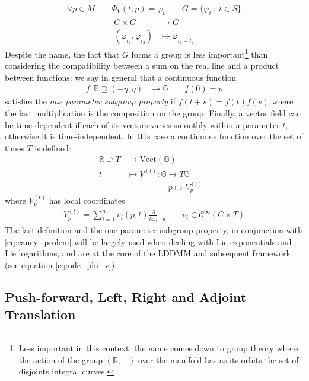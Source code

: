 \begin{align*}
\forall p \in M \qquad \Phi_{V}(t,p) = \varphi_{t}  \qquad G = \{ \varphi_{t} ~:~ t \in S\}
\end{align*}
\begin{align*}
G\times G &\longrightarrow G   \\
(\varphi_{t_1} ,\varphi_{t_2} ) &\longmapsto  \varphi_{t_1 + t_2} 
\end{align*}
Despite the name, the fact that $G$ forms a group is less important\footnote{Less important in this context: the name comes down to group theory where the action of the group $(\mathbb{R},+)$ over the manifold has as its orbits the set of disjoints integral curves.} than considering the compatibility between a sum on the real line and a product between functions: we say in general that a continuous function
\begin{align*}
f : \mathbb{R}\supseteq (-\eta,\eta) & \longrightarrow \mathbb{G}  \qquad f(0) = p
\end{align*}
satisfies the \emph{one parameter subgroup property} if $f(t+s) = f(t) f(s)$ where the last multiplication is the composition on the group. 
Finally, a vector field can be time-dependent if each of its vectors varies smoothly within a parameter $t$, otherwise it is time-independent. In this case a continuous function over the set of times $T$ is defined:
\begin{align*}
\mathbb{R} \supseteq T & \longrightarrow  \text{Vect}(\mathbb{G}) &   \\
t &\longmapsto  V^{(t)}  : \mathbb{G}  \longrightarrow   T\mathbb{G}\\
&  \qquad \qquad \quad p \longmapsto V^{(t)}_{p}
\end{align*}
where $V^{(t)}_{p} $ has local coordinates
\begin{align*}
V^{(t)}_{p} 
=\sum_{i=1}^{n}v_{i}(p,t) \frac{\partial}{\partial x_{i}}~\Bigr|_{p} 
\qquad  
v_{i} \in \mathcal{C}^{\infty}(C\times T)
\end{align*}
The last definition and the one parameter subgroup property, in conjunction with \ref{eq:caucy_prolem} will be largely used when dealing with Lie exponentials and Lie logarithms, and are at the core of the LDDMM and subsequent framework (see equation \ref{eq:ode_phi_v}).

\subsection{Push-forward, Left, Right and Adjoint Translation}

